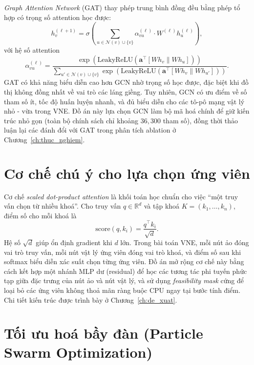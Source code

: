 \documentclass[../DoAn.tex]{subfiles}
\begin{document}
\textit{Graph Attention Network} (GAT)\cite{velickovic2018gat} thay phép trung bình đồng đều bằng phép tổ hợp có trọng số attention học được:
\begin{equation}
    h_v^{(\ell+1)} = \sigma\left( \sum_{u \in \mathcal{N}(v) \cup \{v\}} \alpha_{vu}^{(\ell)} \cdot W^{(\ell)} h_u^{(\ell)} \right),
\end{equation}
với hệ số attention
\begin{equation}
    \alpha_{vu}^{(\ell)} = \frac{\exp\left( \text{LeakyReLU}(\mathbf{a}^\top [W h_v \| W h_u]) \right)}{\sum_{u' \in \mathcal{N}(v) \cup \{v\}} \exp\left( \text{LeakyReLU}(\mathbf{a}^\top [W h_v \| W h_{u'}]) \right)}.
\end{equation}
GAT có khả năng biểu diễn cao hơn GCN nhờ trọng số học được, đặc biệt khi đồ thị không đồng nhất về vai trò các láng giềng. Tuy nhiên, GCN có ưu điểm về số tham số ít, tốc độ huấn luyện nhanh, và đủ biểu diễn cho các tô-pô mạng vật lý nhỏ - vừa trong VNE. Đồ án này lựa chọn GCN làm bộ mã hoá chính để giữ kiến trúc nhỏ gọn (toàn bộ chính sách chỉ khoảng $36{,}300$ tham số), đồng thời thảo luận lại các đánh đổi với GAT trong phân tích ablation ở Chương~\ref{ch:thuc_nghiem}.

\section{Cơ chế chú ý cho lựa chọn ứng viên}
\label{sec:attention}

Cơ chế \textit{scaled dot-product attention}\cite{vaswani2017attention} là khối toán học chuẩn cho việc ``một truy vấn chọn từ nhiều khoá''. Cho truy vấn $q \in \mathbb{R}^d$ và tập khoá $K = (k_1, \ldots, k_n)$, điểm số cho mỗi khoá là
\begin{equation}
    \text{score}(q, k_i) = \frac{q^\top k_i}{\sqrt{d}}.
\end{equation}
Hệ số $\sqrt{d}$ giúp ổn định gradient khi $d$ lớn. Trong bài toán VNE, mỗi nút ảo đóng vai trò truy vấn, mỗi nút vật lý ứng viên đóng vai trò khoá, và điểm số sau khi softmax biểu diễn xác suất chọn từng ứng viên. Đồ án mở rộng cơ chế này bằng cách kết hợp một nhánh MLP dư (residual) để học các tương tác phi tuyến phức tạp giữa đặc trưng của nút ảo và nút vật lý, và sử dụng \textit{feasibility mask} cứng để loại bỏ các ứng viên không thoả mãn ràng buộc CPU ngay tại bước tính điểm. Chi tiết kiến trúc được trình bày ở Chương~\ref{ch:de_xuat}.

\section{Tối ưu hoá bầy đàn (Particle Swarm Optimization)}
\label{sec:pso}
\end{document}
